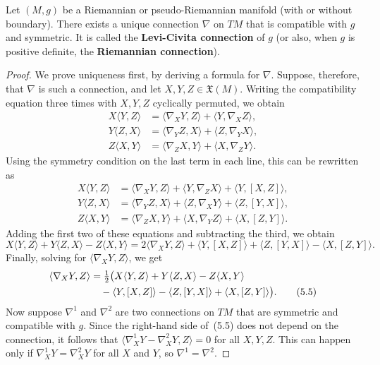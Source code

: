 \begin{theorem}
\label{thm:fundamental-theorem-riemannian-geometry}

Let $(M, g)$ be a Riemannian or pseudo-Riemannian manifold (with or without boundary). There exists a unique connection $\nabla$ on $TM$ that is compatible with $g$ and symmetric. It is called the \textbf{Levi-Civita connection} of $g$ (or also, when $g$ is positive definite, the \textbf{Riemannian connection}).

\begin{proof}
We prove uniqueness first, by deriving a formula for $\nabla$. Suppose, therefore, that $\nabla$ is such a connection, and let $X, Y, Z \in \mathfrak{X}(M)$. Writing the compatibility equation three times with $X, Y, Z$ cyclically permuted, we obtain
\begin{align*}
X\langle Y, Z \rangle &= \langle \nabla_X Y, Z \rangle + \langle Y, \nabla_X Z \rangle, \\
Y\langle Z, X \rangle &= \langle \nabla_Y Z, X \rangle + \langle Z, \nabla_Y X \rangle, \\
Z\langle X, Y \rangle &= \langle \nabla_Z X, Y \rangle + \langle X, \nabla_Z Y \rangle.
\end{align*}
Using the symmetry condition on the last term in each line, this can be rewritten as
\begin{align*}
X\langle Y, Z \rangle &= \langle \nabla_X Y, Z \rangle + \langle Y, \nabla_Z X \rangle + \langle Y, [X, Z] \rangle, \\
Y\langle Z, X \rangle &= \langle \nabla_Y Z, X \rangle + \langle Z, \nabla_X Y \rangle + \langle Z, [Y, X] \rangle, \\
Z\langle X, Y \rangle &= \langle \nabla_Z X, Y \rangle + \langle X, \nabla_Y Z \rangle + \langle X, [Z, Y] \rangle.
\end{align*}
Adding the first two of these equations and subtracting the third, we obtain
\[
X\langle Y, Z \rangle + Y\langle Z, X \rangle - Z\langle X, Y \rangle =
2\langle \nabla_X Y, Z \rangle + \langle Y, [X, Z] \rangle + \langle Z, [Y, X] \rangle - \langle X, [Z, Y] \rangle.
\]
Finally, solving for $\langle \nabla_X Y, Z \rangle$, we get
\begin{align}
\langle \nabla_X Y, Z \rangle &= \tfrac{1}{2}\bigl(X\langle Y, Z \rangle + Y\langle Z, X \rangle - Z\langle X, Y \rangle \notag \\
&\quad - \langle Y, [X, Z] \rangle - \langle Z, [Y, X] \rangle + \langle X, [Z, Y] \rangle\bigr). \tag{5.5}
\end{align}
Now suppose $\nabla^1$ and $\nabla^2$ are two connections on $TM$ that are symmetric and compatible with $g$. Since the right-hand side of~(5.5) does not depend on the connection, it follows that $\langle \nabla^1_X Y - \nabla^2_X Y, Z\rangle = 0$ for all $X, Y, Z$. This can happen only if $\nabla^1_X Y = \nabla^2_X Y$ for all $X$ and $Y$, so $\nabla^1 = \nabla^2$.


\end{proof}
\end{theorem}
